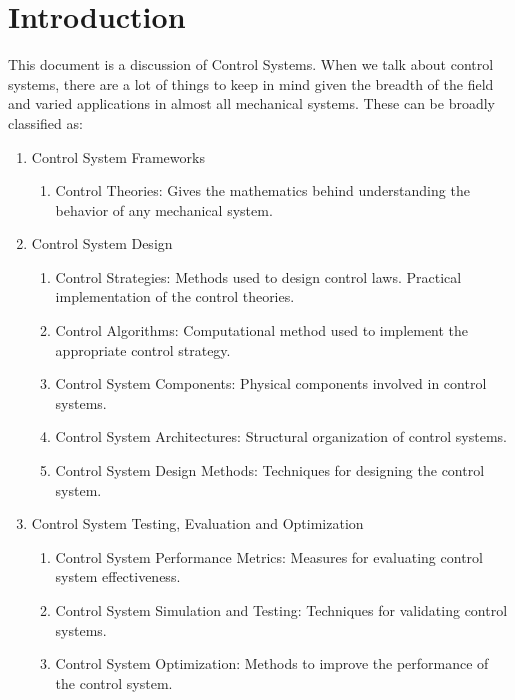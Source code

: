 \documentclass{article}
\begin{document}
\section{Introduction}
This document is a discussion of Control Systems. When we talk about control systems, there are a lot of things to keep in mind given the breadth of the field and varied applications in almost all mechanical systems. These can be broadly classified as:
\begin{enumerate}
    \item Control System Frameworks
        \begin{enumerate}
            \item Control Theories:
            Gives the mathematics behind understanding the behavior of any mechanical system.
        \end{enumerate}
    \item Control System Design
        \begin{enumerate}
            \item Control Strategies:
            Methods used to design control laws. Practical implementation of the control theories.
            \item Control Algorithms:
            Computational method used to implement the appropriate control  strategy.
            \item Control System Components:
            Physical components involved in control systems.
            \item Control System Architectures:
            Structural organization of control systems.
            \item Control System Design Methods:
            Techniques for designing the control system.
        \end{enumerate}
    \item Control System Testing, Evaluation and Optimization
        \begin{enumerate}
            \item Control System Performance Metrics:
            Measures for evaluating control system effectiveness.
            \item Control System Simulation and Testing:
            Techniques for validating control systems.
            \item Control System Optimization:
            Methods to improve the performance of the control system.
        \end{enumerate}
\end{enumerate}
\end{document}
